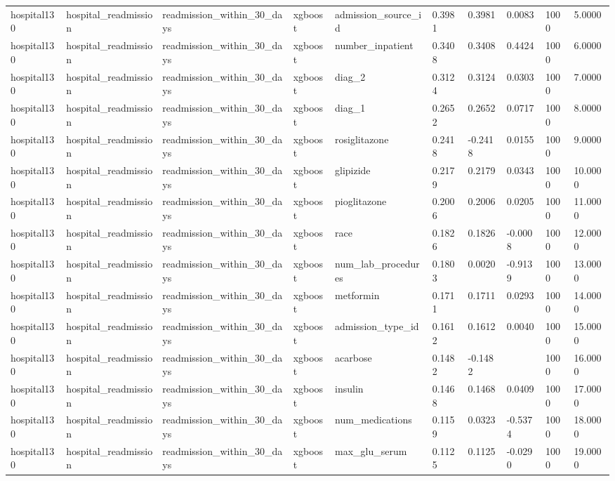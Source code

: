 \begin{tabular}{llllllllll}
hospital130 & hospital\_readmission & readmission\_within\_30\_days & xgboost & admission\_source\_id & 0.3981 & 0.3981 & 0.0083 & 1000 & 5.0000 \\
hospital130 & hospital\_readmission & readmission\_within\_30\_days & xgboost & number\_inpatient & 0.3408 & 0.3408 & 0.4424 & 1000 & 6.0000 \\
hospital130 & hospital\_readmission & readmission\_within\_30\_days & xgboost & diag\_2 & 0.3124 & 0.3124 & 0.0303 & 1000 & 7.0000 \\
hospital130 & hospital\_readmission & readmission\_within\_30\_days & xgboost & diag\_1 & 0.2652 & 0.2652 & 0.0717 & 1000 & 8.0000 \\
hospital130 & hospital\_readmission & readmission\_within\_30\_days & xgboost & rosiglitazone & 0.2418 & -0.2418 & 0.0155 & 1000 & 9.0000 \\
hospital130 & hospital\_readmission & readmission\_within\_30\_days & xgboost & glipizide & 0.2179 & 0.2179 & 0.0343 & 1000 & 10.0000 \\
hospital130 & hospital\_readmission & readmission\_within\_30\_days & xgboost & pioglitazone & 0.2006 & 0.2006 & 0.0205 & 1000 & 11.0000 \\
hospital130 & hospital\_readmission & readmission\_within\_30\_days & xgboost & race & 0.1826 & 0.1826 & -0.0008 & 1000 & 12.0000 \\
hospital130 & hospital\_readmission & readmission\_within\_30\_days & xgboost & num\_lab\_procedures & 0.1803 & 0.0020 & -0.9139 & 1000 & 13.0000 \\
hospital130 & hospital\_readmission & readmission\_within\_30\_days & xgboost & metformin & 0.1711 & 0.1711 & 0.0293 & 1000 & 14.0000 \\
hospital130 & hospital\_readmission & readmission\_within\_30\_days & xgboost & admission\_type\_id & 0.1612 & 0.1612 & 0.0040 & 1000 & 15.0000 \\
hospital130 & hospital\_readmission & readmission\_within\_30\_days & xgboost & acarbose & 0.1482 & -0.1482 &  & 1000 & 16.0000 \\
hospital130 & hospital\_readmission & readmission\_within\_30\_days & xgboost & insulin & 0.1468 & 0.1468 & 0.0409 & 1000 & 17.0000 \\
hospital130 & hospital\_readmission & readmission\_within\_30\_days & xgboost & num\_medications & 0.1159 & 0.0323 & -0.5374 & 1000 & 18.0000 \\
hospital130 & hospital\_readmission & readmission\_within\_30\_days & xgboost & max\_glu\_serum & 0.1125 & 0.1125 & -0.0290 & 1000 & 19.0000 \\

\end{tabular}

